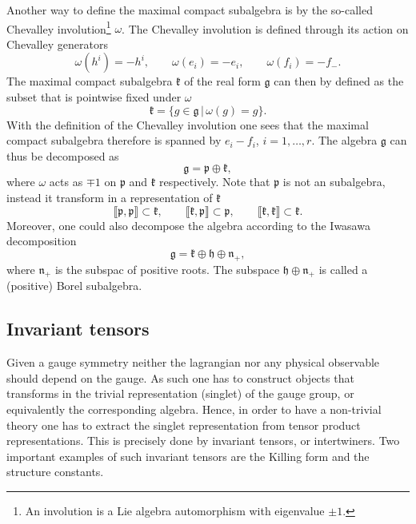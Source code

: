 Another way to define the maximal compact subalgebra is by the so-called Chevalley involution\footnote{An involution is a Lie algebra automorphism with eigenvalue $\pm 1$.} $\omega$. The Chevalley involution is defined through its action on Chevalley generators
\begin{equation}
    \omega(h^i) = -h^i,\qquad \omega(e_i) = -e_i, \qquad \omega(f_i) = -f_-.
\end{equation}
The maximal compact subalgebra $\mathfrak{k}$ of the real form $\mathfrak{g}$ can then by defined as the subset that is pointwise fixed under $\omega$
\begin{equation}
    \mathfrak{k} = \{g\in\mathfrak{g}\,|\, \omega (g) = g \}. 
\end{equation}
With the definition of the Chevalley involution one sees that the maximal compact subalgebra therefore is spanned by $e_i-f_i$, $i=1,\ldots,r$. The algebra $\mathfrak{g}$ can thus be decomposed as 
\begin{equation}
    \mathfrak{g} = \mathfrak{p}\oplus\mathfrak{k},
\end{equation}
where $\omega$ acts as $\mp 1$ on $\mathfrak{p}$ and $\mathfrak{k}$ respectively. Note that $\mathfrak{p}$ is not an subalgebra, instead it transform in a representation of $\mathfrak{k}$ 
\begin{equation}
    \llbracket \mathfrak{p},\mathfrak{p}\rrbracket \subset \mathfrak{k},\qquad \llbracket \mathfrak{k},\mathfrak{p}\rrbracket\subset \mathfrak{p},\qquad \llbracket \mathfrak{k},\mathfrak{k}\rrbracket \subset \mathfrak{k}.
\end{equation}
Moreover, one could also decompose the algebra according to the Iwasawa decomposition 
\begin{equation}
    \mathfrak{g} = \mathfrak{k}\oplus\mathfrak{h}\oplus\mathfrak{n}_+,
\end{equation}
where $\mathfrak{n_+}$ is the subspac of positive roots. The subspace $\mathfrak{h}\oplus\mathfrak{n}_+$ is called a (positive) Borel subalgebra. 

\subsection{Invariant tensors}
Given a gauge symmetry neither the lagrangian nor any physical observable should depend on the gauge. As such one has to construct objects that transforms in the trivial representation (singlet) of the gauge group, or equivalently the corresponding algebra. Hence, in order to have a non-trivial theory one has to extract the singlet representation from tensor product representations. This is precisely done by invariant tensors, or intertwiners. Two important examples of such invariant tensors are the Killing form and the structure constants. 

